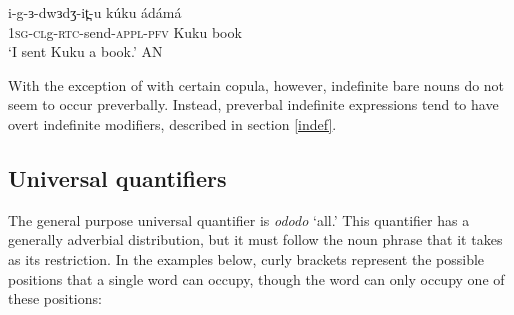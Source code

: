 \ea \gll i-g-ɜ-dwɜdʒ-it̪-u kúku ádámá\\
		1\textsc{sg}-\textsc{cl}g-\textsc{rtc}-send-\textsc{appl}-\textsc{pfv} Kuku book\\	
	\glt 	‘I sent Kuku a book.’	 \hfill AN	\z

With the exception of with certain copula, however, indefinite bare nouns do not seem to occur preverbally. Instead, preverbal indefinite expressions tend to have overt indefinite modifiers, described in section \ref{indef}. 



\subsection{Universal quantifiers}


%
%
%
%
%
%
%
%
%
%
%
%
%
%
%
%	

The general purpose universal quantifier is \textit{ododo} `all.' This quantifier has a generally adverbial distribution, but it must follow the noun phrase that it takes as its restriction. In the examples below, curly brackets represent the possible positions that a single word can occupy, though the word can only occupy one of these positions:

